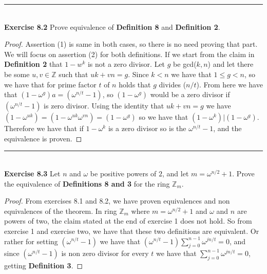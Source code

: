 \documentclass[a4paper]{article}
\begin{document}
\noindent\rule{12cm}{0.4pt}\\
\noindent \textbf{Exercise 8.2} Prove equivalence of \textbf{Definition 8} and \textbf{Definition 2}.
\begin{proof}
Assertion (1) is same in both cases, so there is no need proving that part. We will focus on assertion (2) for both definitions. If we start from the claim in \textbf{Definition 2} that $1 - w^{k}$ is not a zero divisor. Let $g$ be gcd($k,n$) and let there be some $u,v \in \mathbb{Z}$ such that $uk + vn = g$. Since $k<n$ we have that $1 \leq g < n$, so we have that for prime factor $t$ of $n$ holds that $g$ divides ($n/t$). From here we have that $(1 - \omega^{g})a = (\omega^{n/t}-1)$, so $(1 - \omega^{g})$ would be a zero divisor if $(\omega^{n/t}-1)$ is zero divisor. Using the identity that $uk + vn = g$ we have $(1 - \omega^{uk})=(1 - \omega^{uk}\omega^{vn})=(1 - \omega^{g})$ so we have that $(1 - \omega^{k}) | (1 - \omega^{g})$. Therefore we have that if $1 - \omega^{k}$ is a zero divisor so is the $\omega^{n/t}-1$, and the equivalence is proven.
\end{proof}




\noindent\rule{12cm}{0.4pt}\\
\noindent \textbf{Exercise 8.3} Let $n$ and $\omega$ be positive powers of $2$, and let $m = \omega^{n/2} + 1$. Prove the equivalence of \textbf{Definitions 8 and 3} for the ring $\mathbb{Z}_{m}$.
\begin{proof}
From exercises 8.1 and 8.2, we have proven equivalences and non equivalences of the theorem. In ring $\mathbb{Z}_{m}$ where $m=\omega^{n/2}+1$ and $\omega$ and $n$ are powers of two, the claim stated at the end of exercise 1 does not hold. So from exercise 1 and exercise two, we have that these two definitions are equivalent. Or rather for setting $(\omega^{n/t}-1)$ we have that $(\omega^{n/t}-1)\sum^{n-1}_{j=0}\omega^{jn/t}=0$, and since $(\omega^{n/t}-1)$ is non zero divisor for every $t$ we have that $\sum^{n-1}_{j=0}\omega^{jn/t}=0$, getting \textbf{Definition 3}.
\end{proof}
\end{document}
